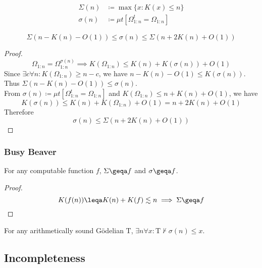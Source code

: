 \documentclass[UTF8,11pt,colorlinks,compress,openany]{beamer}%
\begin{document}
\begin{frame}\frametitle{}
\setlength\abovedisplayskip{0pt}
\setlength\belowdisplayskip{0pt}
	\begin{definition}
		\begin{align*}
		\Sigma(n)&\coloneqq \max\{x: K(x)\leq n\}\\
		\sigma(n)&\coloneqq \mu t\left[\Omega^t_{1:n}=\Omega_{1:n}\right]
		\end{align*}
	\end{definition}
	\begin{lemma}
		\[\Sigma(n-K(n)-O(1))\leq \sigma(n)\leq\Sigma(n+2K(n)+O(1))\]
	\end{lemma}
	\begin{proof}
		\[\Omega_{1:n}=\Omega^{\sigma(n)}_{1:n}\implies K(\Omega_{1:n})\leq K(n)+K(\sigma(n))+O(1)\]
		Since $\exists c\forall n: K(\Omega_{1:n})\geq n-c$, we have $n-K(n)-O(1)\leq K(\sigma(n))$.\\
		Thus $\Sigma(n-K(n)-O(1))\leq \sigma(n)$.\\
		From $\sigma(n)\coloneqq \mu t\left[\Omega^t_{1:n}=\Omega_{1:n}\right]$ and $K(\Omega_{1:n})\leq n+K(n)+O(1)$, we have \[K(\sigma(n))\leq K(n)+K(\Omega_{1:n})+O(1)=n+2K(n)+O(1)\]
		Therefore
		\[\sigma(n)\leq\Sigma(n+2K(n)+O(1))\]
	\end{proof}
\end{frame}

\begin{frame}\frametitle{Busy Beaver}
	\begin{lemma}
		For any computable function $f$, $\Sigma\geqa f$ and $\sigma\geqa f$.
	\end{lemma}
	\begin{proof}
		\[K(f(n))\leqa K(n)+K(f)\lesssim n\implies
		\Sigma\geqa f\]
	\end{proof}
	\begin{theorem}
		For any arithmetically sound G\"odelian $\mathrm{T}$, $\exists n\forall x:\mathrm{T}\nvdash \sigma(n)\leq x$.
	\end{theorem}
\end{frame}

\subsection{Incompleteness}
\end{document}
